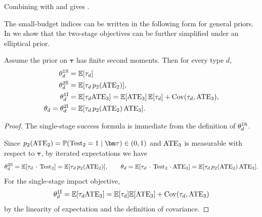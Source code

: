 Combining  with  and  gives .

The small-budget indices can be written in the following form for general priors.
In  we show that the two-stage objectives can be further simplified under an elliptical prior.

\begin{proposition}
  \label{prop:first-stage-coefficient-formulas-appendix}
  Assume the prior on $\bm\tau$ has finite second moments.
  Then for every type $d$,
  \begin{align*}
    \theta_d^{\mathrm{1S}}
    &=
    \mathbb{E}[\tau_d] \\
    \theta_d^{\mathrm{2S}}
    &=
    \mathbb{E}[\tau_d\,p_2(\mathrm{ATE}_2)],\\
    \theta_d^{\mathrm{1I}}
    &=
    \mathbb{E}[\tau_d \mathrm{ATE}_3]
    =
    \mathbb{E}[\mathrm{ATE}_3]\,\mathbb{E}[\tau_d]
    +
    {\rm Cov}(\tau_d,\mathrm{ATE}_3),\\
    \theta_d
    =
    \theta_d^{\mathrm{2I}}
    &=
    \mathbb{E}[\tau_d\,p_2(\mathrm{ATE}_2)\,\mathrm{ATE}_3].
  \end{align*}

\end{proposition}

\begin{proof}
  The single-stage success formula is immediate from the definition of $\theta_d^{\mathrm{1S}}$.

  Since $p_2(\ATE_2)=\P(\Test_2=1\mid\bm\tau)\in(0,1)$ and $\mathrm{ATE}_3$ is measurable with respect to $\bm\tau$, by iterated expectations we have
  \[
    \theta_d^{\mathrm{2S}}
    =
    \mathbb{E}[\tau_d\,\cdot\,\operatorname{Test}_2]
    =
    \mathbb{E}[\tau_d\,p_2(\mathrm{ATE}_2)],
    \qquad
    \theta_d
    =
    \mathbb{E}[\tau_d\,\cdot\,\operatorname{Test}_2\,\cdot\, \mathrm{ATE}_3]
    =
    \mathbb{E}[\tau_d\,p_2(\mathrm{ATE}_2)\,\mathrm{ATE}_3].
  \]
  For the single-stage impact objective,
  \[
    \theta_d^{\mathrm{1I}}
    =
    \mathbb{E}[\tau_d \mathrm{ATE}_3]
    =
    \mathbb{E}[\tau_d]\mathbb{E}[\mathrm{ATE}_3]+{\rm Cov}(\tau_d,\mathrm{ATE}_3)
  \]
  by the linearity of expectation and the definition of covariance.
\end{proof}
